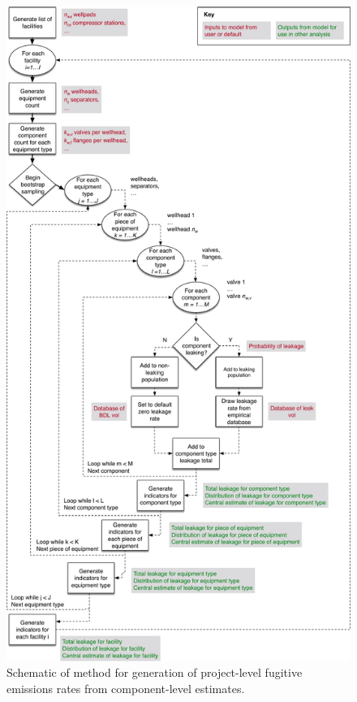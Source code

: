 \documentclass[11pt]{report}
\begin{document}
{{{{\begin{figure}[t]
\includegraphics[width=0.8\columnwidth]{images/FugitivesBootstrapLogicalFlow_v2.pdf}
\caption{Schematic of method for generation of project-level fugitive emissions rates from component-level estimates.}
\label{fig:Component_VF_Flowchart}
\end{figure}

}}}}
\end{document}
